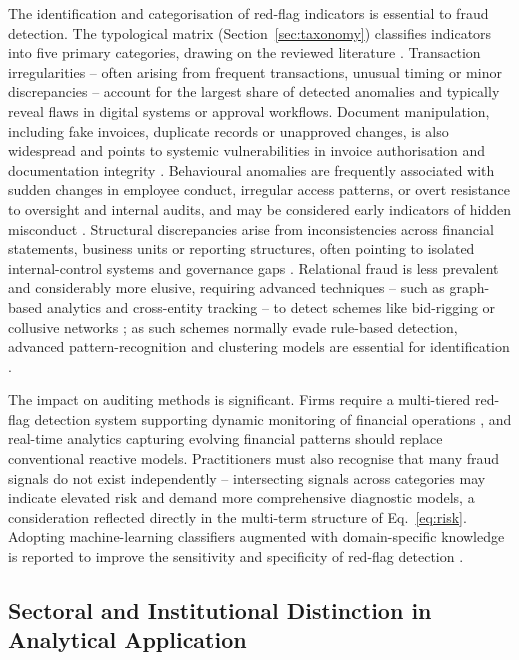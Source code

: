 \documentclass[preprint,12pt]{elsarticle}
\begin{document}
The identification and categorisation of red-flag indicators is essential to fraud detection. The typological matrix (Section~\ref{sec:taxonomy}) classifies indicators into five primary categories, drawing on the reviewed literature \citep{aivaz2024}. Transaction irregularities -- often arising from frequent transactions, unusual timing or minor discrepancies -- account for the largest share of detected anomalies and typically reveal flaws in digital systems or approval workflows. Document manipulation, including fake invoices, duplicate records or unapproved changes, is also widespread and points to systemic vulnerabilities in invoice authorisation and documentation integrity \citep{nogueira2025}. Behavioural anomalies are frequently associated with sudden changes in employee conduct, irregular access patterns, or overt resistance to oversight and internal audits, and may be considered early indicators of hidden misconduct \citep{douglas2024}. Structural discrepancies arise from inconsistencies across financial statements, business units or reporting structures, often pointing to isolated internal-control systems and governance gaps \citep{qatawneh2024}. Relational fraud is less prevalent and considerably more elusive, requiring advanced techniques -- such as graph-based analytics and cross-entity tracking -- to detect schemes like bid-rigging or collusive networks \citep{hilal2022}; as such schemes normally evade rule-based detection, advanced pattern-recognition and clustering models are essential for identification \citep{popoola2023}.

The impact on auditing methods is significant. Firms require a multi-tiered red-flag detection system supporting dynamic monitoring of financial operations \citep{adejumo2025}, and real-time analytics capturing evolving financial patterns should replace conventional reactive models. Practitioners must also recognise that many fraud signals do not exist independently -- intersecting signals across categories may indicate elevated risk and demand more comprehensive diagnostic models, a consideration reflected directly in the multi-term structure of Eq.~\eqref{eq:risk}. Adopting machine-learning classifiers augmented with domain-specific knowledge is reported to improve the sensitivity and specificity of red-flag detection \citep{baeyaert2025}.

\subsection{Sectoral and Institutional Distinction in Analytical Application}
\end{document}
